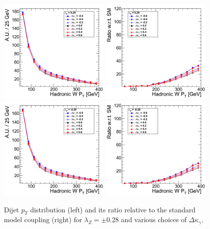 \begin{figure}[h!t]
  {\centering
    \includegraphics[width=0.48\textwidth]{figs/HadronicWpT_028.png}
    \includegraphics[width=0.48\textwidth]{figs/HadronicWpT_028_ratio.png}
    \includegraphics[width=0.48\textwidth]{figs/HadronicWpT_m028.png}
    \includegraphics[width=0.48\textwidth]{figs/HadronicWpT_m028_ratio.png}
    \caption{Dijet $p_T$ distribution (left) and its ratio relative to 
    the standard model coupling (right) for $\lambda_Z = \pm 0.28$ and various choices of $\Delta{\kappa_\gamma}$.}
    \label{fig:ww_dijetPt_atgcRatio028}}
\end{figure}
